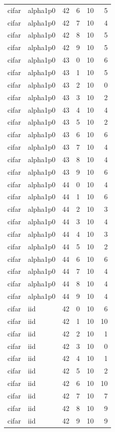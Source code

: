 \begin{tabular}{llrrrr}
cifar & alpha1p0 & 42 & 6 & 10 & 5 \\
cifar & alpha1p0 & 42 & 7 & 10 & 4 \\
cifar & alpha1p0 & 42 & 8 & 10 & 5 \\
cifar & alpha1p0 & 42 & 9 & 10 & 5 \\
cifar & alpha1p0 & 43 & 0 & 10 & 6 \\
cifar & alpha1p0 & 43 & 1 & 10 & 5 \\
cifar & alpha1p0 & 43 & 2 & 10 & 0 \\
cifar & alpha1p0 & 43 & 3 & 10 & 2 \\
cifar & alpha1p0 & 43 & 4 & 10 & 4 \\
cifar & alpha1p0 & 43 & 5 & 10 & 2 \\
cifar & alpha1p0 & 43 & 6 & 10 & 6 \\
cifar & alpha1p0 & 43 & 7 & 10 & 4 \\
cifar & alpha1p0 & 43 & 8 & 10 & 4 \\
cifar & alpha1p0 & 43 & 9 & 10 & 6 \\
cifar & alpha1p0 & 44 & 0 & 10 & 4 \\
cifar & alpha1p0 & 44 & 1 & 10 & 6 \\
cifar & alpha1p0 & 44 & 2 & 10 & 3 \\
cifar & alpha1p0 & 44 & 3 & 10 & 4 \\
cifar & alpha1p0 & 44 & 4 & 10 & 3 \\
cifar & alpha1p0 & 44 & 5 & 10 & 2 \\
cifar & alpha1p0 & 44 & 6 & 10 & 6 \\
cifar & alpha1p0 & 44 & 7 & 10 & 4 \\
cifar & alpha1p0 & 44 & 8 & 10 & 4 \\
cifar & alpha1p0 & 44 & 9 & 10 & 4 \\
cifar & iid & 42 & 0 & 10 & 6 \\
cifar & iid & 42 & 1 & 10 & 10 \\
cifar & iid & 42 & 2 & 10 & 1 \\
cifar & iid & 42 & 3 & 10 & 0 \\
cifar & iid & 42 & 4 & 10 & 1 \\
cifar & iid & 42 & 5 & 10 & 2 \\
cifar & iid & 42 & 6 & 10 & 10 \\
cifar & iid & 42 & 7 & 10 & 7 \\
cifar & iid & 42 & 8 & 10 & 9 \\
cifar & iid & 42 & 9 & 10 & 9 \\

\end{tabular}
